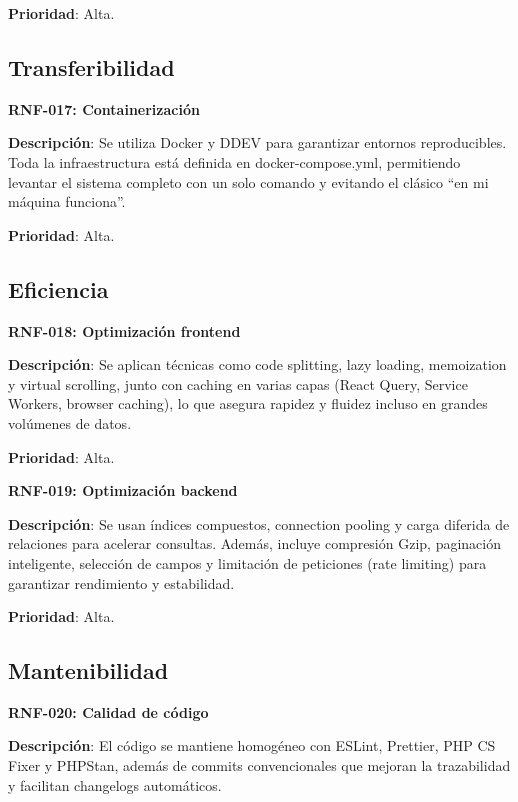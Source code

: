 \documentclass[12pt,a4paper,oneside]{report}
\begin{document}
\textbf{Prioridad}: Alta.

\subsection{Transferibilidad}\label{transferibilidad}

\textbf{RNF-017: Containerización}\label{containerizaciuxf3n}

\textbf{Descripción}: Se utiliza Docker y DDEV para garantizar entornos reproducibles. Toda la infraestructura está definida en docker-compose.yml, permitiendo levantar el sistema completo con un solo comando y evitando el clásico “en mi máquina funciona”.

\textbf{Prioridad}: Alta.

\subsection{Eficiencia}\label{eficiencia}

\textbf{RNF-018: Optimización frontend}\label{optimizaciuxf3n-frontend}

\textbf{Descripción}: Se aplican técnicas como code splitting, lazy loading, memoization y virtual scrolling, junto con caching en varias capas (React Query, Service Workers, browser caching), lo que asegura rapidez y fluidez incluso en grandes volúmenes de datos.

\textbf{Prioridad}: Alta.

\textbf{RNF-019: Optimización backend}\label{optimizaciuxf3n-backend}

\textbf{Descripción}: Se usan índices compuestos, connection pooling y carga diferida de relaciones para acelerar consultas. Además, incluye compresión Gzip, paginación inteligente, selección de campos y limitación de peticiones (rate limiting) para garantizar rendimiento y estabilidad.

\textbf{Prioridad}: Alta.

\subsection{Mantenibilidad}\label{mantenibilidad-1}

\textbf{RNF-020: Calidad de código}\label{calidad-de-cuxf3digo}

\textbf{Descripción}: El código se mantiene homogéneo con ESLint, Prettier, PHP CS Fixer y PHPStan, además de commits convencionales que mejoran la trazabilidad y facilitan changelogs automáticos.
\end{document}
